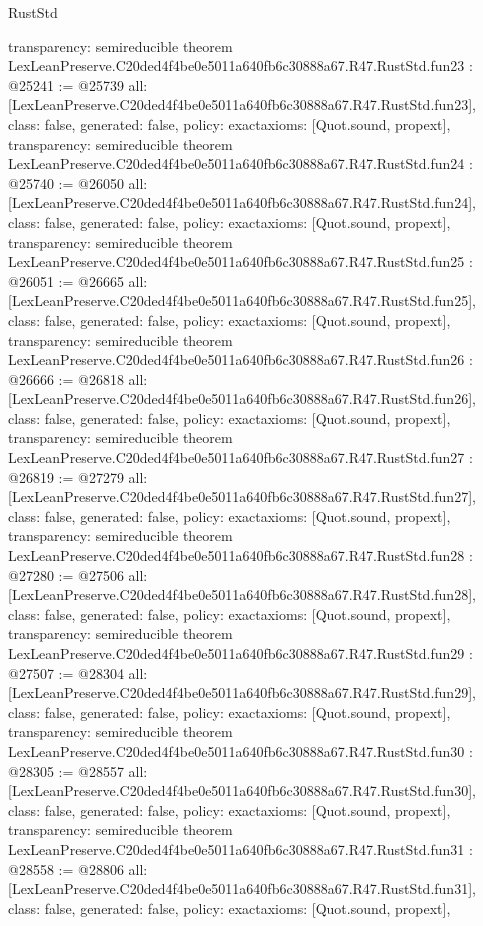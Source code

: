 \begin{lexlean}{RustStd}
\begin{coremodule}
{  transparency: semireducible
}
theorem LexLeanPreserve.C20ded4f4be0e5011a640fb6c30888a67.R47.RustStd.fun23 : @25241 := @25739 {
  all: [LexLeanPreserve.C20ded4f4be0e5011a640fb6c30888a67.R47.RustStd.fun23],
  class: false,
  generated: false,
  policy: exact{axioms: [Quot.sound, propext]},
  transparency: semireducible
}
theorem LexLeanPreserve.C20ded4f4be0e5011a640fb6c30888a67.R47.RustStd.fun24 : @25740 := @26050 {
  all: [LexLeanPreserve.C20ded4f4be0e5011a640fb6c30888a67.R47.RustStd.fun24],
  class: false,
  generated: false,
  policy: exact{axioms: [Quot.sound, propext]},
  transparency: semireducible
}
theorem LexLeanPreserve.C20ded4f4be0e5011a640fb6c30888a67.R47.RustStd.fun25 : @26051 := @26665 {
  all: [LexLeanPreserve.C20ded4f4be0e5011a640fb6c30888a67.R47.RustStd.fun25],
  class: false,
  generated: false,
  policy: exact{axioms: [Quot.sound, propext]},
  transparency: semireducible
}
theorem LexLeanPreserve.C20ded4f4be0e5011a640fb6c30888a67.R47.RustStd.fun26 : @26666 := @26818 {
  all: [LexLeanPreserve.C20ded4f4be0e5011a640fb6c30888a67.R47.RustStd.fun26],
  class: false,
  generated: false,
  policy: exact{axioms: [Quot.sound, propext]},
  transparency: semireducible
}
theorem LexLeanPreserve.C20ded4f4be0e5011a640fb6c30888a67.R47.RustStd.fun27 : @26819 := @27279 {
  all: [LexLeanPreserve.C20ded4f4be0e5011a640fb6c30888a67.R47.RustStd.fun27],
  class: false,
  generated: false,
  policy: exact{axioms: [Quot.sound, propext]},
  transparency: semireducible
}
theorem LexLeanPreserve.C20ded4f4be0e5011a640fb6c30888a67.R47.RustStd.fun28 : @27280 := @27506 {
  all: [LexLeanPreserve.C20ded4f4be0e5011a640fb6c30888a67.R47.RustStd.fun28],
  class: false,
  generated: false,
  policy: exact{axioms: [Quot.sound, propext]},
  transparency: semireducible
}
theorem LexLeanPreserve.C20ded4f4be0e5011a640fb6c30888a67.R47.RustStd.fun29 : @27507 := @28304 {
  all: [LexLeanPreserve.C20ded4f4be0e5011a640fb6c30888a67.R47.RustStd.fun29],
  class: false,
  generated: false,
  policy: exact{axioms: [Quot.sound, propext]},
  transparency: semireducible
}
theorem LexLeanPreserve.C20ded4f4be0e5011a640fb6c30888a67.R47.RustStd.fun30 : @28305 := @28557 {
  all: [LexLeanPreserve.C20ded4f4be0e5011a640fb6c30888a67.R47.RustStd.fun30],
  class: false,
  generated: false,
  policy: exact{axioms: [Quot.sound, propext]},
  transparency: semireducible
}
theorem LexLeanPreserve.C20ded4f4be0e5011a640fb6c30888a67.R47.RustStd.fun31 : @28558 := @28806 {
  all: [LexLeanPreserve.C20ded4f4be0e5011a640fb6c30888a67.R47.RustStd.fun31],
  class: false,
  generated: false,
  policy: exact{axioms: [Quot.sound, propext]},
}
\end{coremodule}
\end{lexlean}
